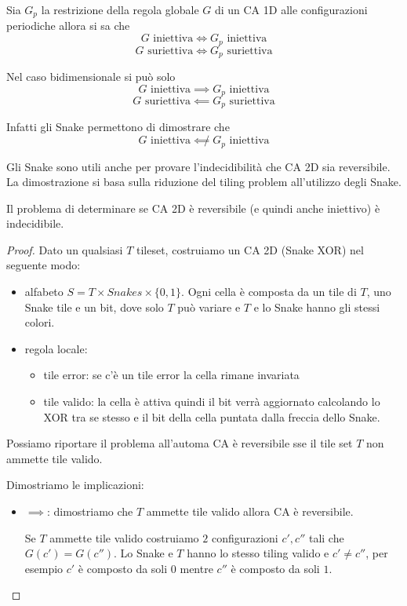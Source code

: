 Sia $G_p$ la restrizione della regola globale $G$ di un CA 1D alle configurazioni 
periodiche allora 
si sa che
$$G \text{ iniettiva} \iff G_p \text{ iniettiva}$$
$$G \text{ suriettiva} \iff G_p \text{ suriettiva}$$

Nel caso bidimensionale si può solo 
$$G \text{ iniettiva} \implies G_p \text{ iniettiva}$$
$$G \text{ suriettiva} \impliedby G_p \text{ suriettiva}$$

Infatti gli Snake permettono di dimostrare che 
$$G \text{ iniettiva} \not\impliedby G_p \text{ iniettiva}$$

Gli Snake sono utili anche per provare l'indecidibilità che CA 2D sia reversibile.
La dimostrazione si basa sulla riduzione del tiling problem all'utilizzo degli 
Snake.

\begin{teorema}
    Il problema di determinare se CA 2D è reversibile (e quindi anche iniettivo)
    è indecidibile.
    \begin{proof}
        Dato un qualsiasi $T$ tileset, costruiamo un CA 2D (Snake XOR) nel seguente modo:
        \begin{itemize}
            \item alfabeto $S = T\times Snakes\times \{0,1\}$. Ogni cella è composta 
            da un tile di $T$, uno Snake tile e un bit, dove solo $T$ può variare e 
            $T$ e lo Snake hanno gli stessi colori.
            \item regola locale:
            \begin{itemize}
                \item tile error: se c'è un tile error la cella rimane invariata
                \item tile valido: la cella è attiva quindi il bit verrà aggiornato 
                calcolando lo XOR tra se stesso e il bit della cella puntata dalla 
                freccia dello Snake.
            \end{itemize}
        \end{itemize}

        Possiamo riportare il problema all'automa CA è reversibile sse il tile 
        set $T$ non ammette tile valido. 

        Dimostriamo le implicazioni:
        \begin{itemize}
            \item $\implies$: dimostriamo che $T$ ammette tile valido allora 
            CA è reversibile.

            Se $T$ ammette tile valido costruiamo $2$ configurazioni $c', c''$
            tali che $G(c') = G(c'')$. Lo Snake e $T$ hanno lo stesso tiling valido
            e $c'\ne c''$, per esempio $c'$ è composto da soli $0$ mentre $c''$ 
            è composto da soli $1$.


\end{itemize}
\end{proof}
\end{teorema}
